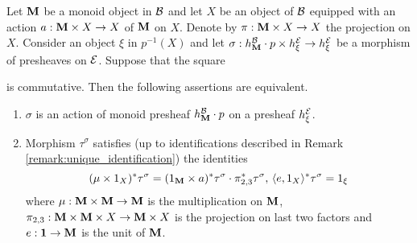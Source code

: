 \begin{proposition}\label{proposition:equivalent_description_of_equivariance_in_representable_case}
Let $\mathbf{M}$ be a monoid object in ${\mathcal B}$ and let $X$ be an object of ${\mathcal B}$ equipped with an action $a:\mathbf{M}\times X\rightarrow X$ of $\mathbf{M}$ on $X$. Denote by $\pi:\mathbf{M}\times X\rightarrow X$ the projection on $X$. Consider an object $\xi$ in $p^{-1}(X)$ and let $\sigma:h^{{\mathcal B}}_{\mathbf{M}} \cdot p \times h^{{\mathcal E}}_{\xi}\rightarrow h^{{\mathcal E}}_{\xi}$ be a morphism of presheaves on ${\mathcal E}$. Suppose that the square
\begin{center}
\end{center}
is commutative. Then the following assertions are equivalent.
\begin{enumerate}[label= \emph{\textbf{(\roman*)}}, leftmargin=3.0em]
\item $\sigma$ is an action of monoid presheaf $h^{{\mathcal B}}_{\mathbf{M}}\cdot p$ on a presheaf $h^{{\mathcal E}}_{\xi}$.
\item Morphism $\tau^{\sigma}$ satisfies (up to identifications described in Remark \ref{remark:unique_identification}) the identities
$$(\mu \times 1_X)^*\tau^{\sigma} = (1_{\mathbf{M}} \times  a)^*\tau^{\sigma} \cdot \pi_{2,3}^*\tau^{\sigma},\,\langle e, 1_{X} \rangle^*\tau^{\sigma} = 1_{\xi}$$
where $\mu: \mathbf{M} \times \mathbf{M} \rightarrow \mathbf{M}$ is the multiplication on $\mathbf{M}$, $\pi_{2,3}:\mathbf{M}\times  \mathbf{M} \times  X \rightarrow \mathbf{M} \times X$ is the projection on last two factors and $e:\mathbf{1}\rightarrow \mathbf{M}$ is the unit of $\mathbf{M}$.
\end{enumerate}
\end{proposition}
